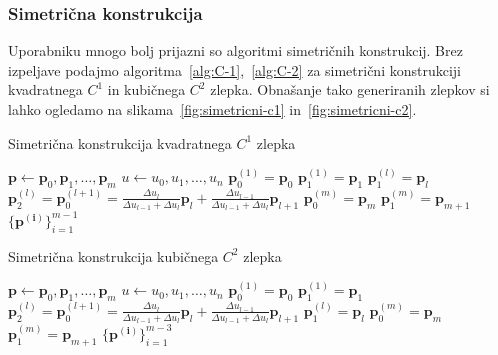 \documentclass[isrm2, tisk]{fmfdelo}
\newcommand{\p}{\mathbf{p}}
\begin{document}
    \subsubsection{Simetrična konstrukcija}
    Uporabniku mnogo bolj prijazni so algoritmi simetričnih konstrukcij.
    Brez izpeljave podajmo algoritma~\ref{alg:C-1},~\ref{alg:C-2} za simetrični konstrukciji kvadratnega $C^1$ in kubičnega $C^2$ zlepka.
    Obnašanje tako generiranih zlepkov si lahko ogledamo na slikama~\ref{fig:simetricni-c1} in~\ref{fig:simetricni-c2}.
    \begin{algorithm}[H]
        \caption{Simetrična konstrukcija kvadratnega $C^1$ zlepka}
        \label{alg:C-1}
        \begin{algorithmic}
            \State $\p \gets \p_0,\p_1,\dots,\p_{m}$
            \State $u \gets u_0,u_1,\dots,u_n$
            \State $\p_0^{(1)} = \p_0$
            \State $\p_1^{(1)} = \p_1$
                \State $\p_1^{(l)}=\p_{l}$
                \State $\p_2^{(l)} = \p_0^{(l+1)} = \frac{\Delta u_l}{\Delta u_{l-1} + \Delta u_{l}}\p_l+\frac{\Delta u_{l-1}}{\Delta u_{l-1} + \Delta u_{l}}\p_{l+1}$
            \EndFor
            \State $\p_0^{(m)} = \p_m$
            \State $\p_1^{(m)} = \p_{m+1}$
            \State \Return $\{\mathbf{p^{(i)}}\}^{m-1}_{i=1}$
        \end{algorithmic}
    \end{algorithm}
    \begin{algorithm}[H]
        \caption{Simetrična konstrukcija kubičnega $C^2$ zlepka}
        \label{alg:C-2}
        \begin{algorithmic}
            \State $\p \gets \p_0,\p_1,\dots,\p_{m}$
            \State $u \gets u_0,u_1,\dots,u_n$
            \State $\p_0^{(1)} = \p_0$
            \State $\p_1^{(1)} = \p_1$
                \State $\p_2^{(l)} = \p_0^{(l+1)} = \frac{\Delta u_l}{\Delta u_{l-1} + \Delta u_{l}}\p_l+\frac{\Delta u_{l-1}}{\Delta u_{l-1} + \Delta u_{l}}\p_{l+1}$
                \State $\p_1^{(l)}=\p_{l}$
            \EndFor
            \State $\p_0^{(m)} = \p_m$
            \State $\p_1^{(m)} = \p_{m+1}$
            \State \Return $\{\mathbf{p^{(i)}}\}^{m-3}_{i=1}$
        \end{algorithmic}
    \end{algorithm}
\end{document}
